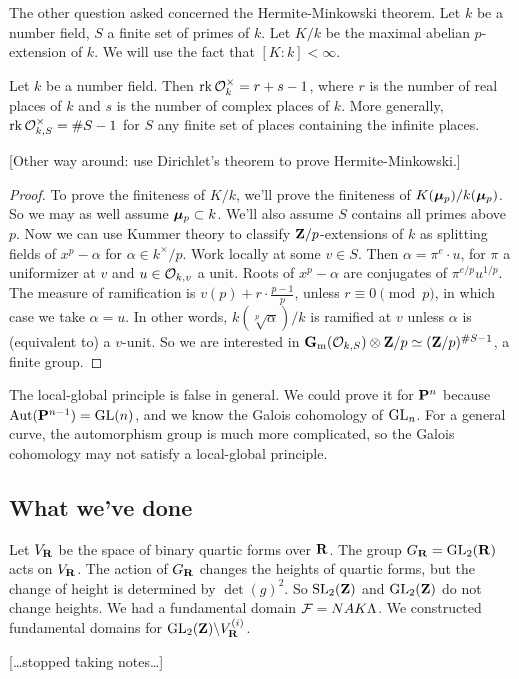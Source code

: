 The other question asked concerned the Hermite-Minkowski theorem. Let $k$ 
be a number field, $S$ a finite set of primes of $k$. Let $K/k$ be the 
maximal abelian $p$-extension of $k$. We will use the fact that 
$[K:k]<\infty$. 

\begin{theorem}[Dirichlet]
Let $k$ be a number field. Then $\operatorname{rk} \mathcal{O}_k^\times=r+s-1$, where $r$ is the 
number of real places of $k$ and $s$ is the number of complex places of $k$. 
More generally, $\operatorname{rk} \mathcal{O}_{k,S}^\times = \# S-1$ for $S$ any finite set of 
places containing the infinite places. 
\end{theorem}

[Other way around: use Dirichlet's theorem to prove Hermite-Minkowski.]

\begin{proof}
To prove the finiteness of $K/k$, we'll prove the finiteness of 
$K({\bm\mu}_p)/k({\bm\mu}_p)$. So we may as well assume ${\bm\mu}_p\subset k$. We'll also 
assume $S$ contains all primes above $p$. Now we can use Kummer theory to 
classify $\mathbf{Z}/p$-extensions of $k$ as splitting fields of $x^p-\alpha$ for 
$\alpha\in k^\times/p$. Work locally at some $v\in S$. Then 
$\alpha=\pi^e\cdot u$, for $\pi$ a uniformizer at $v$ and $u\in \mathcal{O}_{k,v}$ a 
unit. Roots of $x^p-\alpha$ are conjugates of $\pi^{e/p} u^{1/p}$. The measure 
of ramification is $v(p)+r\cdot \frac{p-1}{p}$, unless $r\equiv 0\pmod p$, in 
which case we take $\alpha=u$. In other words, $k(\sqrt[p]{\alpha})/k$ is 
ramified at $v$ unless $\alpha$ is (equivalent to) a $v$-unit. So we are 
interested in $\mathbf{G}_\mathrm{m}(\mathcal{O}_{k,S})\otimes \mathbf{Z}/p \simeq (\mathbf{Z}/p)^{\# S-1}$, a finite 
group. 
\end{proof}

The local-global principle is false in general. We could prove it for 
$\mathbf{P}^n$ because $\operatorname{Aut}(\mathbf{P}^{n-1})=\operatorname{GL}(n)$, and we know the Galois 
cohomology of $\operatorname{GL}_n$. For a general curve, the automorphism group is much 
more complicated, so the Galois cohomology may not satisfy a local-global 
principle. 





\subsection{What we've done}

Let $V_{\mathbf{R}}$ be the space of binary quartic forms over $\mathbf{R}$. The group 
$G_{\mathbf{R}}=\operatorname{GL}_2(\mathbf{R})$ acts on $V_{\mathbf{R}}$. The action of $G_{\mathbf{R}}$ changes the heights 
of quartic forms, but the change of height is determined by $\det(g)^2$. So 
$\operatorname{SL}_2(\mathbf{Z})$ and $\operatorname{GL}_2(\mathbf{Z})$ do not change heights. We had a fundamental 
domain $\mathcal{F}=N A K \Lambda$. We constructed fundamental domains for 
$\operatorname{GL}_2(\mathbf{Z})\backslash V_{\mathbf{R}}^{(i)}$. 

[\ldots stopped taking notes\ldots]




